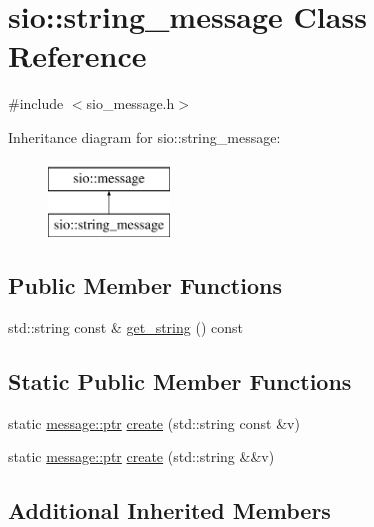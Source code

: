 \hypertarget{classsio_1_1string__message}{}\section{sio\+:\+:string\+\_\+message Class Reference}
\label{classsio_1_1string__message}


{\ttfamily \#include $<$sio\+\_\+message.\+h$>$}

Inheritance diagram for sio\+:\+:string\+\_\+message\+:\begin{figure}[H]
\begin{center}
\leavevmode
\includegraphics[height=2.000000cm]{classsio_1_1string__message}
\end{center}
\end{figure}
\subsection*{Public Member Functions}
\begin{DoxyCompactItemize}
\item 
std\+::string const  \& \hyperlink{classsio_1_1string__message_a8c79f0c15468e15251029c9f1612ca44}{get\+\_\+string} () const
\end{DoxyCompactItemize}
\subsection*{Static Public Member Functions}
\begin{DoxyCompactItemize}
\item 
static \hyperlink{classsio_1_1message_a6340b6fef57e4516eb17928b1885a615}{message\+::ptr} \hyperlink{classsio_1_1string__message_a0614dc0722eacc4f40ac6dcbcc03b819}{create} (std\+::string const \&v)
\item 
static \hyperlink{classsio_1_1message_a6340b6fef57e4516eb17928b1885a615}{message\+::ptr} \hyperlink{classsio_1_1string__message_a91c0f23b04c84649b1a7ee8ed8351348}{create} (std\+::string \&\&v)
\end{DoxyCompactItemize}
\subsection*{Additional Inherited Members}


